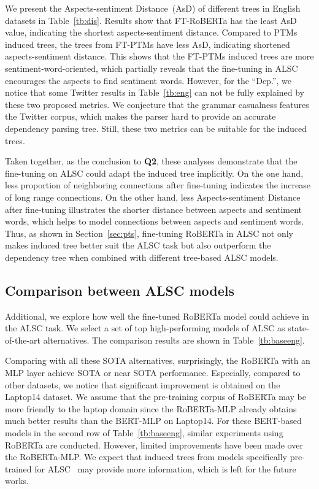 \documentclass[11pt]{article}
\begin{document}
We present the Aspects-sentiment Distance~(AsD) of different trees in English datasets in Table~\ref{tb:dis}. Results show that FT-RoBERTa has the least AsD value, indicating the shortest aspects-sentiment distance. Compared to PTMs induced trees, the trees from  FT-PTMs have less AsD, indicating shortened aspects-sentiment distance. This shows that the FT-PTMs induced trees are more sentiment-word-oriented, which partially reveals that the fine-tuning in ALSC encourages the aspects to find sentiment words. However, for the ``Dep.'', we notice that some Twitter results in Table~\ref{tb:eng} can not be fully explained  by these two proposed metrics. We conjecture that the grammar casualness  features the Twitter corpus, which makes the parser hard to provide an accurate dependency parsing tree. Still, these two metrics can be suitable for the induced trees.

Taken together, as the conclusion to \textbf{Q2}, these analyses demonstrate that the fine-tuning on ALSC could adapt the induced tree implicitly. On the one hand, less proportion of neighboring connections after fine-tuning indicates the increase of long range connections. On the other hand, less Aspects-sentiment Distance  after fine-tuning illustrates the shorter distance between aspects and sentiment words, which helps to model connections between aspects and sentiment words.
Thus, as shown in Section~\ref{sec:pts}, fine-tuning RoBERTa in ALSC not only makes induced tree better suit the ALSC task but also outperform the dependency tree when combined with different tree-based ALSC models.



\subsection{Comparison between ALSC models}
\label{sec:ana}
Additional, we explore how well the fine-tuned RoBERTa model could achieve in the ALSC task. We select a set of top high-performing models of ALSC as state-of-the-art alternatives. The comparison results are shown in Table~\ref{tb:baseeng}.


Comparing with all these SOTA alternatives, surprisingly, the RoBERTa with an MLP layer achieve SOTA or near SOTA performance. Especially, compared to other datasets, we notice that significant improvement is obtained on the Laptop14 dataset. We assume that the pre-training corpus of RoBERTa may be more friendly to the laptop domain since the RoBERTa-MLP already obtains much better results than the  BERT-MLP on Laptop14.  For these BERT-based models in the second row of Table~\ref{tb:baseeng},  similar experiments using RoBERTa are conducted. However, limited improvements have been made over the RoBERTa-MLP. We expect that induced trees from models specifically pre-trained for ALSC~\citep{DBLP:conf/acl/TianGXLHWWW20} may provide more information, which is left for the future works.
\end{document}
